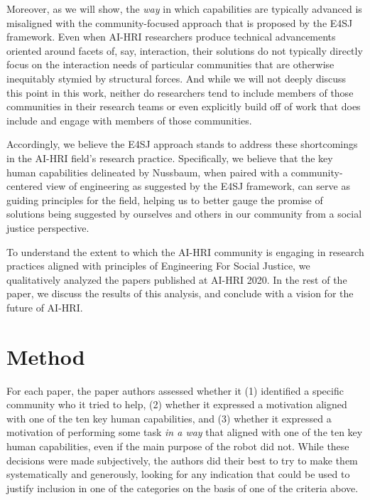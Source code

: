 \documentclass[letterpaper]{article} %
\begin{document}
Moreover, as we will show, the \textit{way} in which capabilities are typically advanced is misaligned with the community-focused approach that is proposed by the E4SJ framework.
Even when AI-HRI researchers produce technical advancements oriented around facets of, say, interaction, their solutions do not typically directly focus on the interaction needs of particular communities that are otherwise inequitably stymied by structural forces. And while we will not deeply discuss this point in this work, neither do researchers tend to include members of those communities in their research teams or even explicitly build off of work that does include and engage with members of those communities. 

Accordingly, we believe the E4SJ approach stands to address these shortcomings in the AI-HRI field's research practice. Specifically, we believe that the key human capabilities delineated by Nussbaum, when paired with a community-centered view of engineering as suggested by the E4SJ framework, can serve as guiding principles for the field, helping us to better gauge the promise of solutions being suggested by ourselves and others in our community from a social justice perspective.



To understand the extent to which the AI-HRI community is engaging in research practices aligned with principles of Engineering For Social Justice, we qualitatively analyzed the papers published at AI-HRI 2020. In the rest of the paper, we discuss the results of this analysis, and conclude with a vision for the future of AI-HRI.

\section{Method}
 For each paper, the paper authors assessed whether it (1) identified a specific community who it tried to help, (2) whether it expressed a motivation aligned with one of the ten key human capabilities, and (3) whether it expressed a motivation of performing some task \textit{in a way} that aligned with one of the ten key human capabilities, even if the main purpose of the robot did not. While these decisions were made subjectively, the authors did their best to try to make them systematically and generously, looking for any indication that could be used to justify inclusion in one of the categories on the basis of one of the criteria above.
\end{document}

